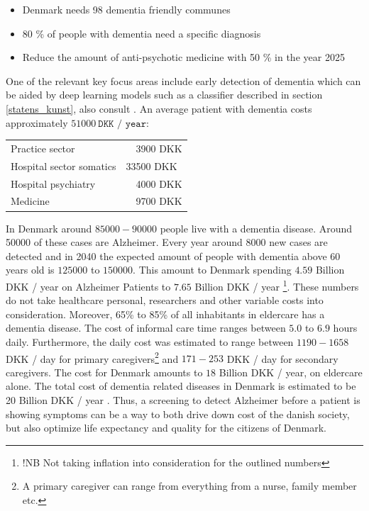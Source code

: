 \documentclass[12pt, fleqn, titlepage]{article}
\begin{document}
\begin{itemize}
	\item Denmark needs 98 dementia friendly communes
	\item 80 \% of people with dementia need a specific diagnosis 
	\item Reduce the amount of anti-psychotic medicine with 50 \% in the year 2025
\end{itemize}
\noindent
One of the relevant key focus areas include early detection of dementia which can be aided by deep learning models such as a classifier described in section \ref{statens_kunst}, also consult \cite{yudong, suk_and_shen_1, suk_and_shen_2, cheng, neuro}. An average patient with dementia costs approximately $ 51000 \ \texttt{DKK / year}$:

		
		\begin{table}[H]
			\begin{tabular}{ll}
				Practice sector   &\ \ 3900  DKK  \\
				Hospital sector somatics  & 33500 DKK \\
				Hospital psychiatry  &  \ \ 4000  DKK  \\
				Medicine & \ \ 9700  DKK 
			\end{tabular}
		\end{table}
		
		In Denmark around $ 85000-90000 $ people live with a dementia disease. Around 50000 of these cases are Alzheimer. Every year around $ 8000 $ new cases are detected and in 2040 the expected amount of people with dementia above 60 years old is $ 125000 $ to $ 150000 $. This amount to Denmark spending $ 4.59 $ Billion DKK / year on Alzheimer Patients to $ 7.65 $ Billion DKK / year \footnote{!NB Not taking inflation into consideration for the outlined numbers}. These numbers do not take healthcare personal, researchers and other variable costs into consideration. Moreover, 65\% to 85\% of all inhabitants in eldercare has a dementia disease. The cost of informal care time ranges between $ 5.0 $ to $ 6.9 $ hours daily. Furthermore, the daily cost was estimated to range between $ 1190 - 1658 $ DKK / day for primary caregivers\footnote{A primary caregiver can range from everything from a nurse, family member etc.} and $ 171 - 253 $ DKK / day for secondary caregivers. The cost for Denmark amounts to $ 18 $ Billion DKK / year, on eldercare alone. The total cost of dementia related diseases in Denmark is estimated to be 20 Billion DKK / year \cite{Alzheimerforeningen} \cite{informal_care}. Thus, a screening to detect Alzheimer before a patient is showing symptoms can be a way to both drive down cost of the danish society, but also optimize life expectancy and quality for the citizens of Denmark.
		
\end{document}
